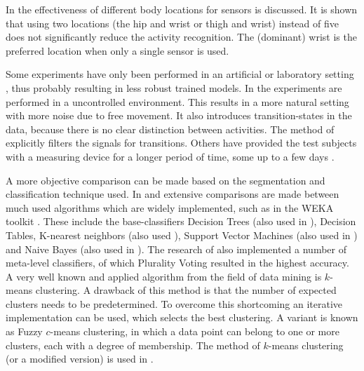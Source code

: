 In \cite{bao2004activity} the effectiveness of different body locations for sensors is discussed.
It is shown that using two locations (the hip and wrist or thigh and wrist) instead of five does not significantly reduce the activity recognition.
The (dominant) wrist is the preferred location when only a single sensor is used.

Some experiments have only been performed in an artificial or laboratory setting \cite{minnen2006discovering, yang2008using, perdikis2008recognition, guenterberg2009automatic, ravi2005activity, bao2004activity, sherril2005using, he2009activity}, thus probably resulting in less robust trained models.
In \cite{siirtola2012recognizing, kwapisz2011activity} the experiments are performed in a uncontrolled environment.
This results in a more natural setting with more noise due to free movement.
It also introduces transition-states in the data, because there is no clear distinction between activities.
The method of \cite{krause2003unsupervised} explicitly filters the signals for transitions.
Others have provided the test subjects with a measuring device for a longer period of time, some up to a few days \cite{krause2003unsupervised, long2009single}.

A more objective comparison can be made based on the segmentation and classification technique used.
In \cite{bao2004activity} and \cite{ravi2005activity} extensive comparisons are made between much used algorithms which are widely implemented, such as in the WEKA toolkit \cite{hall2009weka}.
These include the base-classifiers Decision Trees (also used in \cite{kwapisz2011activity,duque2012offline}), Decision Tables, K-nearest neighbors (also used \cite{duque2012offline, siirtola2012recognizing}), Support Vector Machines (also used in \cite{derawi2010accelerometer,he2009activity, he2008activity}) and Naive Bayes (also used in \cite{long2009single}).
The research of \cite{bao2004activity} also implemented a number of meta-level classifiers, of which Plurality Voting resulted in the highest accuracy.
A very well known and applied algorithm from the field of data mining is $k$-means clustering.
A drawback of this method is that the number of expected clusters needs to be predetermined.
To overcome this shortcoming an iterative implementation can be used, which selects the best clustering.
A variant is known as Fuzzy $c$-means clustering, in which a data point can belong to one or more clusters, each with a degree of membership.
The method of $k$-means clustering (or a modified version) is used in \cite{krause2003unsupervised, zhou2008aligned, lee2178physical}.

